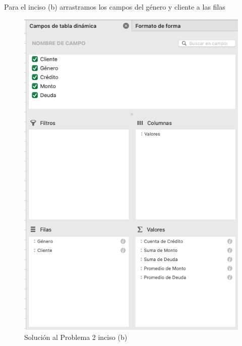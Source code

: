 \documentclass{article}
\begin{document}
\break
\noindent
Para el inciso (b) arrastramos los campos del género y cliente a las filas
\begin{figure}[!ht]
    \centering
    \begin{minipage}{\textwidth}
        \centering
        \includegraphics[width=\textwidth]{figures/s102-2.png}
    \end{minipage}
    \captionsetup{width=0.9\textwidth}
    \caption{Solución al Problema 2 inciso (b)}
    \label{fig:s102-2}
\end{figure}
\end{document}
